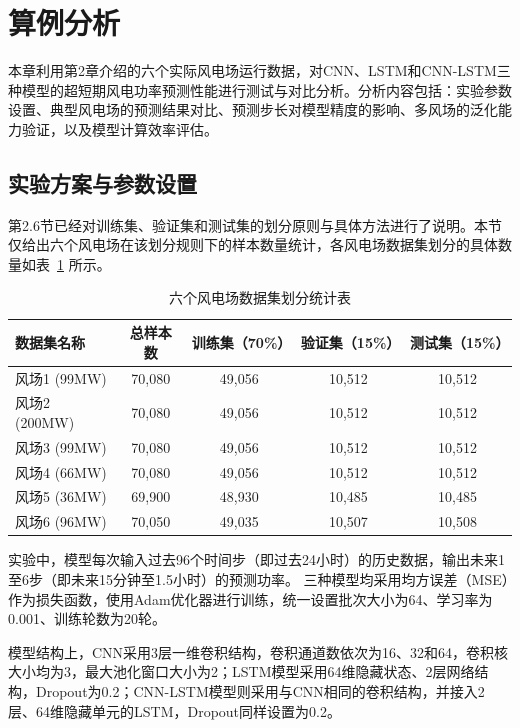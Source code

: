 \section{算例分析}

本章利用第2章介绍的六个实际风电场运行数据，对CNN、LSTM和CNN-LSTM三种模型的超短期风电功率预测性能进行测试与对比分析。分析内容包括：实验参数设置、典型风电场的预测结果对比、预测步长对模型精度的影响、多风场的泛化能力验证，以及模型计算效率评估。

\subsection{实验方案与参数设置}
第2.6节已经对训练集、验证集和测试集的划分原则与具体方法进行了说明。本节仅给出六个风电场在该划分规则下的样本数量统计，各风电场数据集划分的具体数量如表~\ref{tab:dataset_split} 所示。

\begin{table}[H]
    \centering
    \caption{六个风电场数据集划分统计表}
    \label{tab:dataset_split}
    \begin{tabular}{lcccc}
        \toprule
        数据集名称 & 总样本数 & 训练集（70\%） & 验证集（15\%） & 测试集（15\%） \\
        \midrule
        风场1 (99MW) & 70,080 & 49,056 & 10,512 & 10,512 \\
        风场2 (200MW)& 70,080 & 49,056 & 10,512 & 10,512 \\
        风场3 (99MW) & 70,080 & 49,056 & 10,512 & 10,512 \\
        风场4 (66MW) & 70,080 & 49,056 & 10,512 & 10,512 \\
        风场5 (36MW) & 69,900 & 48,930 & 10,485 & 10,485 \\
        风场6 (96MW) & 70,050 & 49,035 & 10,507 & 10,508 \\
        \bottomrule
    \end{tabular}
\end{table}

实验中，模型每次输入过去96个时间步（即过去24小时）的历史数据，输出未来1至6步（即未来15分钟至1.5小时）的预测功率。
三种模型均采用均方误差（MSE）作为损失函数，使用Adam优化器进行训练，统一设置批次大小为64、学习率为0.001、训练轮数为20轮。

模型结构上，CNN采用3层一维卷积结构，卷积通道数依次为16、32和64，卷积核大小均为3，最大池化窗口大小为2；LSTM模型采用64维隐藏状态、2层网络结构，Dropout为0.2；CNN-LSTM模型则采用与CNN相同的卷积结构，并接入2层、64维隐藏单元的LSTM，Dropout同样设置为0.2。

